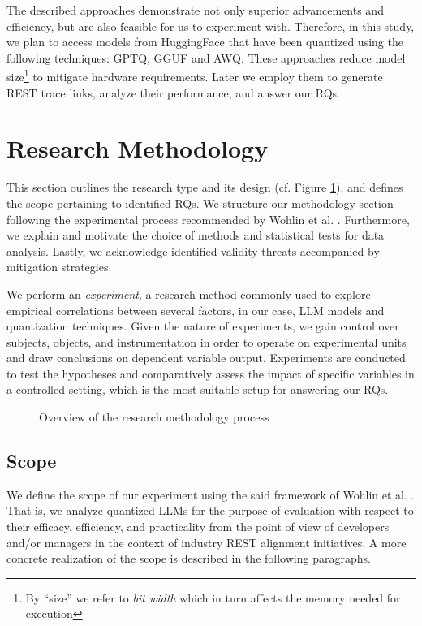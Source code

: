 \documentclass[conference]{IEEEtran}
\begin{document}
The described approaches demonstrate not only superior advancements and efficiency, but are also feasible for us to experiment with. Therefore, in this study, we plan to access models from HuggingFace that have been quantized using the following techniques: GPTQ, GGUF and AWQ. These approaches reduce model size\footnote{By ``size'' we refer to \textit{bit width} which in turn affects the memory needed for execution} to mitigate hardware requirements. Later we employ them to generate REST trace links, analyze their performance, and answer our RQs. 

\section{Research Methodology}\label{sec:method}


This section outlines the research type and its design (cf. Figure \ref{fig:method-overview}), and defines the scope pertaining to identified RQs. We structure our methodology section following the experimental process recommended by Wohlin et al. \cite{wohlin2012experimentation}. Furthermore, we explain and motivate the choice of methods and statistical tests for data analysis. Lastly, we acknowledge identified validity threats accompanied by mitigation strategies.

We perform an \textit{experiment}, a research method commonly used to explore empirical correlations between several factors, in our case, LLM models and quantization techniques. Given the nature of  experiments, we gain control over subjects, objects, and instrumentation in order to operate on experimental units and draw conclusions on dependent variable output. Experiments are conducted to test the hypotheses and comparatively assess the impact of specific variables in a controlled setting, which is the most suitable setup for answering our RQs.

\begin{figure}[h]
    \centering
    
    \caption{Overview of the research methodology process}
    \label{fig:method-overview}
\end{figure}

\subsection{Scope}
We define the scope of our experiment using the said framework of Wohlin et al. \cite{wohlin2012experimentation}. That is, we analyze quantized LLMs for the purpose of evaluation with respect to their efficacy, efficiency, and practicality from the point of view of developers and/or managers in the context of industry REST alignment initiatives. A more concrete realization of the scope is described in the following paragraphs.
\end{document}
